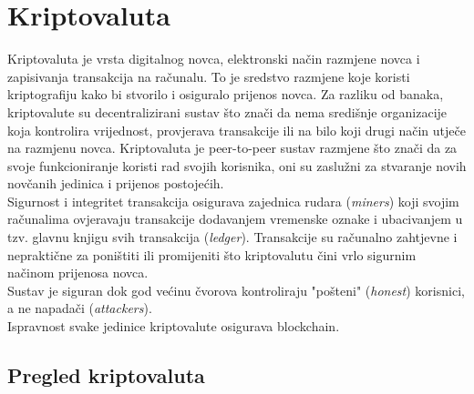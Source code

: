 \documentclass[12pt]{article}
\begin{document}
\section{Kriptovaluta}
Kriptovaluta je vrsta digitalnog novca, elektronski način razmjene novca i zapisivanja transakcija na računalu. To je sredstvo razmjene koje koristi kriptografiju kako bi stvorilo i osiguralo prijenos novca.\cite{cc-wiki} Za razliku od banaka, kriptovalute su decentralizirani sustav što znači da nema središnje organizacije koja kontrolira vrijednost, provjerava transakcije ili na bilo koji drugi način utječe na razmjenu novca. Kriptovaluta je peer-to-peer sustav razmjene što znači da za svoje funkcioniranje koristi rad svojih korisnika, oni su zaslužni za stvaranje novih novčanih jedinica i prijenos postojećih.\\
Sigurnost i integritet transakcija osigurava zajednica rudara (\textit{miners}) koji svojim računalima ovjeravaju transakcije dodavanjem vremenske oznake i ubacivanjem u tzv. glavnu knjigu svih transakcija (\textit{ledger}). Transakcije su računalno zahtjevne i nepraktične za poništiti ili promijeniti što kriptovalutu čini vrlo sigurnim načinom prijenosa novca. \\
Sustav je siguran dok god većinu čvorova kontroliraju "pošteni" (\textit{honest}) korisnici, a ne napadači (\textit{attackers}). \\
Ispravnost svake jedinice kriptovalute osigurava blockchain.\cite{cc-survey}

\subsection{Pregled kriptovaluta}
\cite{bitcoin}
\end{document}
